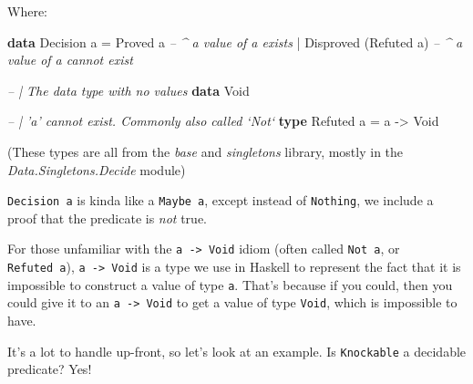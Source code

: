 \documentclass[]{article}
\newenvironment{Shaded}{}{}
\newcommand{\CommentTok}[1]{\textcolor[rgb]{0.38,0.63,0.69}{\textit{#1}}}
\newcommand{\DataTypeTok}[1]{\textcolor[rgb]{0.56,0.13,0.00}{#1}}
\newcommand{\FunctionTok}[1]{\textcolor[rgb]{0.02,0.16,0.49}{#1}}
\newcommand{\KeywordTok}[1]{\textcolor[rgb]{0.00,0.44,0.13}{\textbf{#1}}}
\newcommand{\NormalTok}[1]{#1}
\newcommand{\OtherTok}[1]{\textcolor[rgb]{0.00,0.44,0.13}{#1}}
\begin{document}
Where:

\begin{Shaded}
\begin{Highlighting}[]
\KeywordTok{data} \DataTypeTok{Decision}\NormalTok{ a }\FunctionTok{=} \DataTypeTok{Proved}\NormalTok{ a                  }\CommentTok{-- ^ a value of a exists}
                \FunctionTok{|} \DataTypeTok{Disproved}\NormalTok{ (}\DataTypeTok{Refuted}\NormalTok{ a)     }\CommentTok{-- ^ a value of a cannot exist}


\CommentTok{-- | The data type with no values}
\KeywordTok{data} \DataTypeTok{Void}

\CommentTok{-- | 'a' cannot exist.  Commonly also called `Not`}
\KeywordTok{type} \DataTypeTok{Refuted}\NormalTok{ a }\FunctionTok{=}\NormalTok{ a }\OtherTok{->} \DataTypeTok{Void}
\end{Highlighting}
\end{Shaded}

(These types are all from the \emph{base} and \emph{singletons} library, mostly
in the \emph{Data.Singletons.Decide} module)

\texttt{Decision\ a} is kinda like a \texttt{Maybe\ a}, except instead of
\texttt{Nothing}, we include a proof that the predicate is \emph{not} true.

For those unfamiliar with the \texttt{a\ -\textgreater{}\ Void} idiom (often
called \texttt{Not\ a}, or \texttt{Refuted\ a}),
\texttt{a\ -\textgreater{}\ Void} is a type we use in Haskell to represent the
fact that it is impossible to construct a value of type \texttt{a}. That's
because if you could, then you could give it to an
\texttt{a\ -\textgreater{}\ Void} to get a value of type \texttt{Void}, which is
impossible to have.

It's a lot to handle up-front, so let's look at an example. Is
\texttt{Knockable} a decidable predicate? Yes!

\begin{Shaded}
\end{Shaded}
\end{document}
